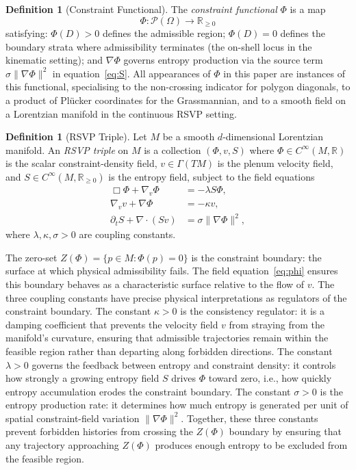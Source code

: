 \documentclass[11pt]{article}
\theoremstyle{plain}
\theoremstyle{definition}
\newtheorem{definition}[theorem]{Definition}
\theoremstyle{remark}
\newcommand{\R}{\mathbb{R}}
\newcommand{\Phif}{\Phi}
\newcommand{\vf}{v}
\newcommand{\Sf}{S}
\newcommand{\OmKS}{\Omega}
\begin{document}
\begin{definition}[Constraint Functional]
\label{def:constraint-functional}
The \emph{constraint functional} $\Phif$ is a map
\[
  \Phif : \mathcal{P}(\OmKS) \to \R_{\geq 0}
\]
satisfying: $\Phif(D) > 0$ defines the admissible region; $\Phif(D) = 0$ defines the boundary strata where admissibility terminates (the on-shell locus in the kinematic setting); and $\nabla\Phif$ governs entropy production via the source term $\sigma\|\nabla\Phif\|^2$ in equation~\eqref{eq:S}. All appearances of $\Phif$ in this paper are instances of this functional, specialising to the non-crossing indicator for polygon diagonals, to a product of Pl\"{u}cker coordinates for the Grassmannian, and to a smooth field on a Lorentzian manifold in the continuous RSVP setting.
\end{definition}

\begin{definition}[RSVP Triple]
Let $M$ be a smooth $d$-dimensional Lorentzian manifold. An \emph{RSVP triple} on $M$ is a collection $(\Phif, \vf, \Sf)$ where $\Phif \in C^\infty(M, \R)$ is the scalar constraint-density field, $\vf \in \Gamma(TM)$ is the plenum velocity field, and $\Sf \in C^\infty(M, \R_{\geq 0})$ is the entropy field, subject to the field equations
\begin{align}
  \Box \Phif + \nabla_\vf \Phif &= -\lambda \Sf \Phif, \label{eq:phi}\\
  \nabla_\vf \vf + \nabla \Phif &= -\kappa \vf, \label{eq:v}\\
  \partial_t \Sf + \nabla \cdot (\Sf \vf) &= \sigma \|\nabla \Phif\|^2, \label{eq:S}
\end{align}
where $\lambda, \kappa, \sigma > 0$ are coupling constants.
\end{definition}

The zero-set $Z(\Phif) = \{p \in M : \Phif(p) = 0\}$ is the constraint boundary: the surface at which physical admissibility fails. The field equation~\eqref{eq:phi} ensures this boundary behaves as a characteristic surface relative to the flow of $\vf$. The three coupling constants have precise physical interpretations as regulators of the constraint boundary. The constant $\kappa > 0$ is the consistency regulator: it is a damping coefficient that prevents the velocity field $\vf$ from straying from the manifold's curvature, ensuring that admissible trajectories remain within the feasible region rather than departing along forbidden directions. The constant $\lambda > 0$ governs the feedback between entropy and constraint density: it controls how strongly a growing entropy field $\Sf$ drives $\Phif$ toward zero, i.e., how quickly entropy accumulation erodes the constraint boundary. The constant $\sigma > 0$ is the entropy production rate: it determines how much entropy is generated per unit of spatial constraint-field variation $\|\nabla\Phif\|^2$. Together, these three constants prevent forbidden histories from crossing the $Z(\Phif)$ boundary by ensuring that any trajectory approaching $Z(\Phif)$ produces enough entropy to be excluded from the feasible region.
\end{document}
